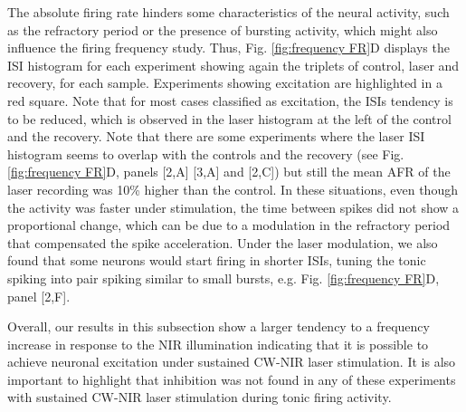The absolute firing rate hinders some characteristics of the neural activity, such as the refractory period or the presence of bursting activity, which might also influence the firing frequency study. Thus, Fig. \ref{fig:frequency FR}D displays the ISI histogram for each experiment showing again the triplets of control, laser and recovery, for each sample. Experiments showing excitation are highlighted in a red square. Note that for most cases classified as excitation, the ISIs tendency is to be reduced, which is observed in the laser histogram at the left of the control and the recovery. Note that there are some experiments where the laser ISI histogram seems to overlap with the controls and the recovery (see Fig. \ref{fig:frequency FR}D, panels [2,A] [3,A] and [2,C]) but still the mean AFR of the laser recording was 10\% higher than the control. In these situations, even though the activity was faster under stimulation, the time between spikes did not show a proportional change, which can be due to a modulation in the refractory period that compensated the spike acceleration. Under the laser modulation, we also found that some neurons would start firing in shorter ISIs, tuning the tonic spiking into pair spiking similar to small bursts, e.g. Fig. \ref{fig:frequency FR}D, panel [2,F].

Overall, our results in this subsection show a larger tendency to a frequency increase in response to the NIR illumination indicating that it is possible to achieve neuronal excitation under sustained CW-NIR laser stimulation. It is also important to highlight that inhibition was not found in any of these experiments with sustained CW-NIR laser stimulation during tonic firing activity. 


